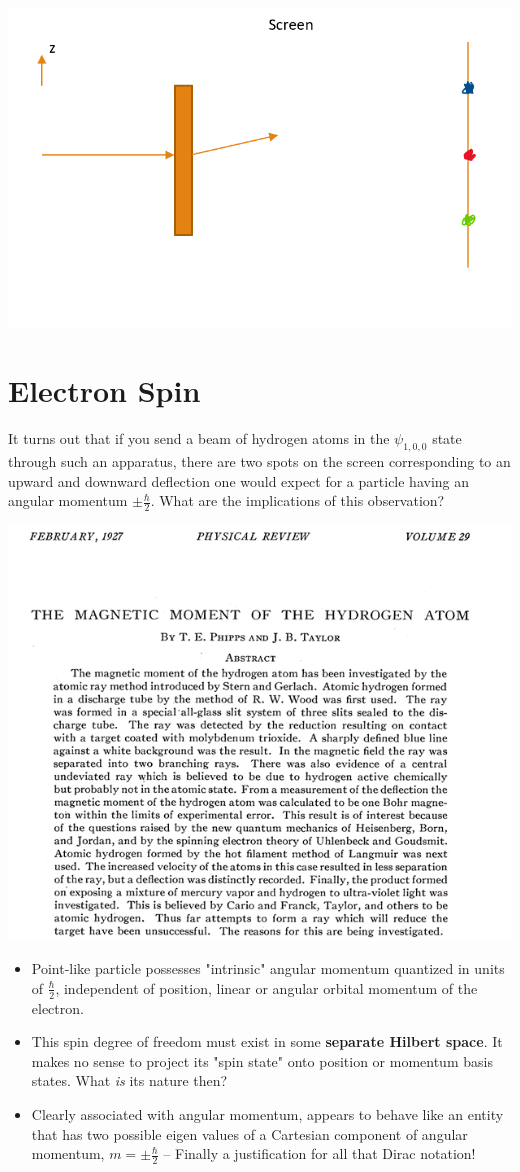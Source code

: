 \documentclass{article}
\begin{document}
\includegraphics[width = 0.7 \textwidth]{Lecture23/1.png}



\section{Electron Spin}

It turns out that if you send a beam of hydrogen atoms in the $\psi_{1,0,0}$ state through such an apparatus, there are two spots on the screen corresponding to an upward and downward deflection one would expect for a particle having an angular momentum $\pm \frac{\hbar}{2}$.  What are the implications of this observation? 

\includegraphics[width = 0.7 \textwidth]{Lecture23/2.png}

\begin{itemize}
    \item Point-like particle possesses "intrinsic" angular momentum quantized in units of $\frac{\hbar}{2}$, independent of position, linear or angular orbital momentum of the electron. 
    
    \item This spin degree of freedom must exist in some \textbf{separate Hilbert space}. It makes no sense to project its "spin state"  onto position or momentum basis states. What \textit{is} its nature then?
    
    \item Clearly associated with angular momentum, appears to behave like an entity that has two possible eigen values of a Cartesian component of angular momentum, $m = \pm \frac{\hbar}{2}$ -- Finally a justification for all that Dirac notation!
\end{itemize}
\end{document}
